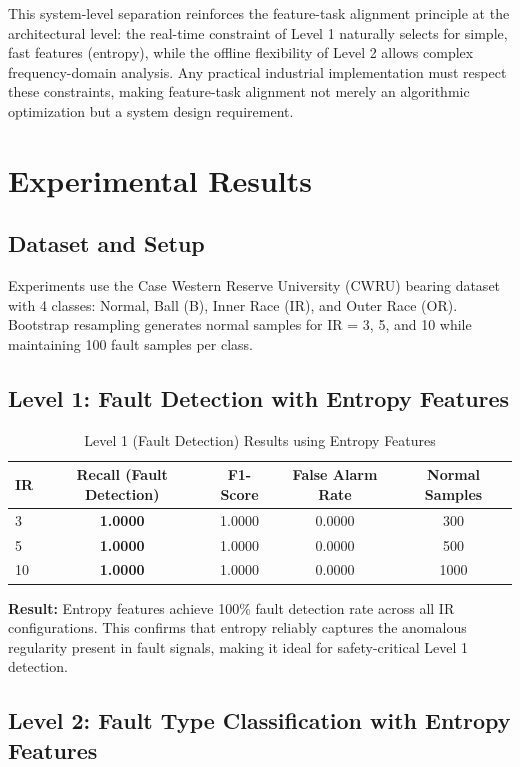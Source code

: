 \documentclass[11pt]{article}
\begin{document}
This system-level separation reinforces the feature-task alignment principle at the architectural level: the real-time constraint of Level 1 naturally selects for simple, fast features (entropy), while the offline flexibility of Level 2 allows complex frequency-domain analysis. Any practical industrial implementation must respect these constraints, making feature-task alignment not merely an algorithmic optimization but a system design requirement.

\section{Experimental Results}

\subsection{Dataset and Setup}
Experiments use the Case Western Reserve University (CWRU) bearing dataset with 4 classes: Normal, Ball (B), Inner Race (IR), and Outer Race (OR). Bootstrap resampling generates normal samples for IR = 3, 5, and 10 while maintaining 100 fault samples per class.

\subsection{Level 1: Fault Detection with Entropy Features}

\begin{table}[htbp]
\centering
\caption{Level 1 (Fault Detection) Results using Entropy Features}
\label{tab:level1}
\begin{tabular}{|l|c|c|c|c|}
\toprule
IR & Recall (Fault Detection) & F1-Score & False Alarm Rate & Normal Samples \\ \midrule
3 & \textbf{1.0000} & 1.0000 & 0.0000 & 300 \\
5 & \textbf{1.0000} & 1.0000 & 0.0000 & 500 \\
10 & \textbf{1.0000} & 1.0000 & 0.0000 & 1000 \\
\bottomrule
\end{tabular}
\end{table}

\textbf{Result:} Entropy features achieve 100\% fault detection rate across all IR configurations. This confirms that entropy reliably captures the anomalous regularity present in fault signals, making it ideal for safety-critical Level 1 detection.

\subsection{Level 2: Fault Type Classification with Entropy Features}
\end{document}
